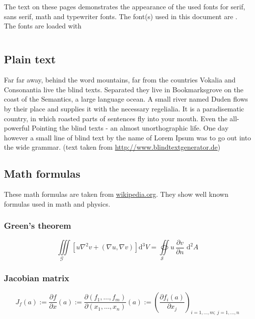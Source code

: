 \documentclass[%
   final,      %
   paper=a4,%
   paper=portrait, %
   pagesize=auto, %
   fontsize=11pt,%
   version=last, %
   english, %
 ]{scrbook} %
\begin{document}
\pagestyle{empty}
\ofoot[]{} 
\renewcommand*{\chapterheadstartvskip}{\vspace{-5\baselineskip}}%
\chapter*{\fontdesc}
The text on these pages demonstrates the appearance of the used fonts for serif, sans serif, math and typewriter fonts. The font(s) used in this document are \textit{\fontdesc}. The fonts are loaded with
\begin{lstlisting}[style=demostyle, basicstyle=\ttfamily\footnotesize]
%%? <*fontcode*>
\end{lstlisting}

\section*{Plain text}

Far far away, behind the word mountains, far from the countries Vokalia and Consonantia live the blind texts. Separated they live in Bookmarksgrove on the coast of the Semantics, a large language ocean. A small river named Duden flows by their place and supplies it with the necessary regelialia. It is a paradisematic country, in which roasted parts of sentences fly into your mouth. Even the all-powerful Pointing the blind texts - an almost unorthographic life. One day however a small line of blind text by the name of Lorem Ipsum was to go out into the wide grammar. (text taken from {\small \url{http://www.blindtextgenerator.de}}) 

\section*{Math formulas}
These math formulas are taken from \url{wikipedia.org}. They show well known formulas used in math and physics.

\subsection*{Green's theorem}
%
\begin{equation*}
  \underset{\mathcal{G}\quad}\iiint
  \left[u\nabla^{2}v+\left(\nabla  u,\nabla  v\right)\right]\mathrm{d}^{3}V
  =\underset{\mathcal{S}\quad}\oiint  u\,\frac{\partial v}{\partial n}
  \,\,\mathrm{d}^{2}A
\end{equation*}
%
\subsection*{Jacobian matrix}
%
\begin{equation*}
  J_f(a) := \frac{\partial {f}}{\partial {x}}(a) 
         := \frac{\partial(f_1,  \ldots, f_m)}{\partial(x_1, \ldots, x_n)}(a)
         := \left(\frac{\partial f_i(a)}{\partial x_j}\right)_{i=1,\ldots,m;\
             j=1,\ldots,n}
\end{equation*}
\enlargethispage{100\baselineskip}
\end{document}
